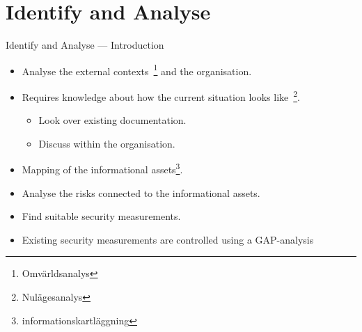 \documentclass{beamer}
\begin{document}
\section{Identify and Analyse}
\begin{frame}{Identify and Analyse --- Introduction}
  \begin{itemize}
    \item Analyse the external contexts~\footnote{Omvärldsanalys} and the organisation.
    \item Requires knowledge about how the current situation looks
      like~\footnote{Nulägesanalys}.
      \begin{itemize}
        \item Look over existing documentation.
        \item Discuss within the organisation.
      \end{itemize}
    \item Mapping of the informational assets\footnote{informationskartläggning}.
    \item Analyse the risks connected to the informational assets.
    \item Find suitable security measurements.
    \item Existing security measurements are controlled using a GAP-analysis
  \end{itemize}
\end{frame}
\end{document}
